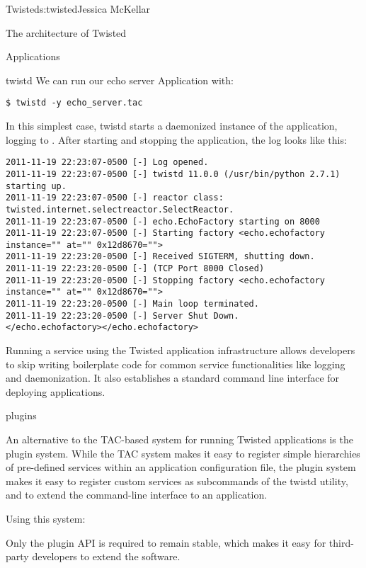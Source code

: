 \begin{aosachapter}{Twisted}{s:twisted}{Jessica McKellar}
\begin{aosasect1}{The architecture of Twisted}
\begin{aosasect2}{Applications}
\begin{aosasect3}{twistd}
We can run our echo server Application with:

\begin{verbatim}
$ twistd -y echo_server.tac
\end{verbatim}

In this simplest case, twistd starts a daemonized instance of the
application, logging to . After starting and stopping the
application, the log looks like this:

\begin{verbatim}
2011-11-19 22:23:07-0500 [-] Log opened.
2011-11-19 22:23:07-0500 [-] twistd 11.0.0 (/usr/bin/python 2.7.1) starting up.
2011-11-19 22:23:07-0500 [-] reactor class: twisted.internet.selectreactor.SelectReactor.
2011-11-19 22:23:07-0500 [-] echo.EchoFactory starting on 8000
2011-11-19 22:23:07-0500 [-] Starting factory <echo.echofactory instance="" at="" 0x12d8670="">
2011-11-19 22:23:20-0500 [-] Received SIGTERM, shutting down.
2011-11-19 22:23:20-0500 [-] (TCP Port 8000 Closed)
2011-11-19 22:23:20-0500 [-] Stopping factory <echo.echofactory instance="" at="" 0x12d8670="">
2011-11-19 22:23:20-0500 [-] Main loop terminated.
2011-11-19 22:23:20-0500 [-] Server Shut Down.
</echo.echofactory></echo.echofactory>
\end{verbatim}

Running a service using the Twisted application infrastructure allows
developers to skip writing boilerplate code for common service functionalities
like logging and daemonization. It also establishes a standard command line
interface for deploying applications.

\end{aosasect3}

\begin{aosasect3}{plugins}

An alternative to the TAC-based system for running Twisted applications is
the plugin system. While the TAC system makes it easy to register simple
hierarchies of pre-defined services within an application configuration file,
the plugin system makes it easy to register custom services as subcommands of
the twistd utility, and to extend the command-line interface to an
application.

Using this system:

\begin{aosaenumerate}

\item Only the plugin API is required to remain stable, which makes it
  easy for third-party developers to extend the software.


\end{aosaenumerate}
\end{aosasect3}
\end{aosasect2}
\end{aosasect1}
\end{aosachapter}
